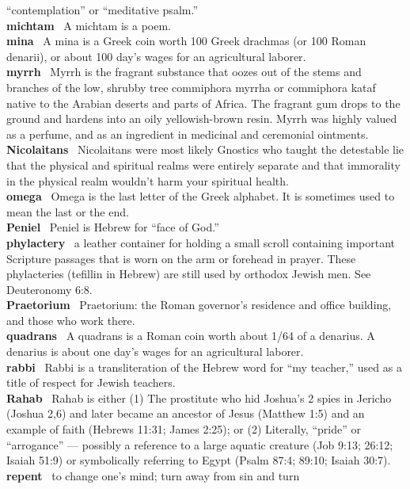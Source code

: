``contemplation'' or ``meditative psalm.''\\
\textbf{michtam}~ A michtam is a poem.\\
\textbf{mina}~ A mina is a Greek coin worth 100 Greek drachmas (or 100
Roman denarii), or about 100 day's wages for an agricultural laborer.\\
\textbf{myrrh}~ Myrrh is the fragrant substance that oozes out of the
stems and branches of the low, shrubby tree commiphora myrrha or
commiphora kataf native to the Arabian deserts and parts of Africa. The
fragrant gum drops to the ground and hardens into an oily
yellowish-brown resin. Myrrh was highly valued as a perfume, and as an
ingredient in medicinal and ceremonial ointments.\\
\textbf{Nicolaitans}~ Nicolaitans were most likely Gnostics who taught
the detestable lie that the physical and spiritual realms were entirely
separate and that immorality in the physical realm wouldn't harm your
spiritual health.\\
\textbf{omega}~ Omega is the last letter of the Greek alphabet. It is
sometimes used to mean the last or the end.\\
\textbf{Peniel}~ Peniel is Hebrew for ``face of God.''\\
\textbf{phylactery}~ a leather container for holding a small scroll
containing important Scripture passages that is worn on the arm or
forehead in prayer. These phylacteries (tefillin in Hebrew) are still
used by orthodox Jewish men. See Deuteronomy 6:8.\\
\textbf{Praetorium}~ Praetorium: the Roman governor's residence and
office building, and those who work there.\\
\textbf{quadrans}~ A quadrans is a Roman coin worth about 1/64 of a
denarius. A denarius is about one day's wages for an agricultural
laborer.\\
\textbf{rabbi}~ Rabbi is a transliteration of the Hebrew word for ``my
teacher,'' used as a title of respect for Jewish teachers.\\
\textbf{Rahab}~ Rahab is either (1) The prostitute who hid Joshua's 2
spies in Jericho (Joshua 2,6) and later became an ancestor of Jesus
(Matthew 1:5) and an example of faith (Hebrews 11:31; James 2:25); or
(2) Literally, ``pride'' or ``arrogance'' --- possibly a reference to a
large aquatic creature (Job 9:13; 26:12; Isaiah 51:9) or symbolically
referring to Egypt (Psalm 87:4; 89:10; Isaiah 30:7).\\
\textbf{repent}~ to change one's mind; turn away from sin and turn

